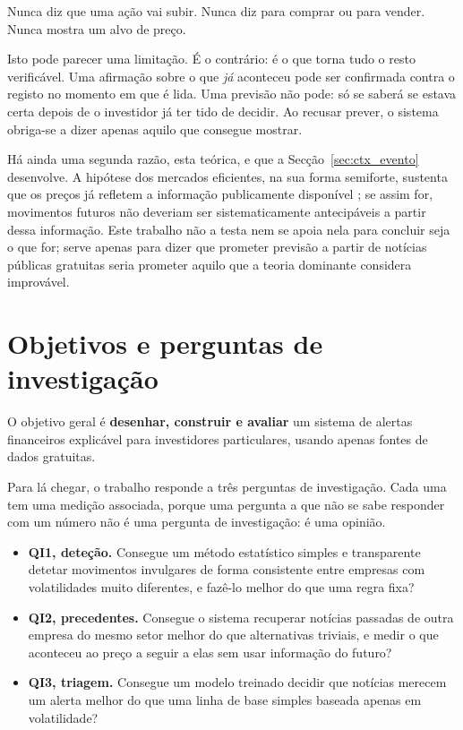 Nunca diz que uma ação vai subir. Nunca diz para comprar ou para vender. Nunca mostra um alvo de
preço.

Isto pode parecer uma limitação. É o contrário: é o que torna tudo o resto verificável. Uma
afirmação sobre o que \emph{já} aconteceu pode ser confirmada contra o registo no momento em que é
lida. Uma previsão não pode: só se saberá se estava certa depois de o investidor já ter tido de
decidir. Ao recusar prever, o sistema obriga-se a dizer apenas aquilo que consegue mostrar.

Há ainda uma segunda razão, esta teórica, e que a Secção~\ref{sec:ctx_evento} desenvolve. A hipótese
dos mercados eficientes, na sua forma semiforte, sustenta que os preços já refletem a informação
publicamente disponível \autocite{fama1970efficient}; se assim for, movimentos futuros não deveriam
ser sistematicamente antecipáveis a partir dessa informação. Este trabalho não a testa nem se apoia nela para
concluir seja o que for; serve apenas para dizer que prometer previsão a partir de notícias públicas
gratuitas seria prometer aquilo que a teoria dominante considera improvável.

\section{Objetivos e perguntas de investigação}
\label{sec:intro_objetivos}

O objetivo geral é \textbf{desenhar, construir e avaliar} um sistema de alertas financeiros
explicável para investidores particulares, usando apenas fontes de dados gratuitas.

Para lá chegar, o trabalho responde a três perguntas de investigação. Cada uma tem uma medição
associada, porque uma pergunta a que não se sabe responder com um número não é uma pergunta de
investigação: é uma opinião.

\begin{itemize}
  \item \textbf{\gls{QI}1, deteção.} Consegue um método estatístico simples e transparente
        detetar movimentos invulgares de forma consistente entre empresas com volatilidades muito
        diferentes, e fazê-lo melhor do que uma regra fixa?
  \item \textbf{\gls{QI}2, precedentes.} Consegue o sistema recuperar notícias passadas de outra
        empresa do mesmo setor melhor do que alternativas triviais, e medir o que aconteceu ao
        preço a seguir a elas sem usar informação do futuro?
  \item \textbf{\gls{QI}3, triagem.} Consegue um modelo treinado decidir que notícias merecem um
        alerta melhor do que uma linha de base simples baseada apenas em volatilidade?
\end{itemize}

